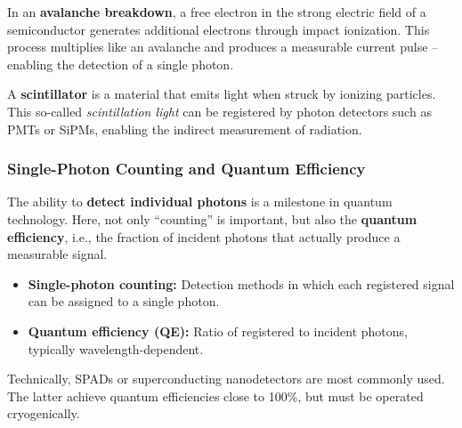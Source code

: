 \begin{tcolorbox}[didaktikbox, title=Concept: Avalanche Breakdown]
	\label{box:avalanche}
	\small
	In an \textbf{avalanche breakdown}, a free electron in the strong electric field of a semiconductor generates additional electrons through impact ionization. This process multiplies like an avalanche and produces a measurable current pulse – enabling the detection of a single photon.
\end{tcolorbox}
\vspace{1em}
\begin{tcolorbox}[didaktikbox, title=Concept: Scintillator]
	\label{box:szintillator}
	\small
	A \textbf{scintillator} is a material that emits light when struck by ionizing particles. This so-called \emph{scintillation light} can be registered by photon detectors such as PMTs or SiPMs, enabling the indirect measurement of radiation.
\end{tcolorbox}

\subsubsection{Single-Photon Counting and Quantum Efficiency}

The ability to \textbf{detect individual photons} is a milestone in quantum technology. Here, not only “counting” is important, but also the \textbf{quantum efficiency}, i.e., the fraction of incident photons that actually produce a measurable signal.
\vspace{1em}
\begin{tcolorbox}[physikbox, title=Physical Terms]
	\label{box:begriffe}
	\small
	\begin{itemize}
		\item \textbf{Single-photon counting:} Detection methods in which each registered signal can be assigned to a single photon.
		\item \textbf{Quantum efficiency (QE):} Ratio of registered to incident photons, typically wavelength-dependent.
	\end{itemize}
\end{tcolorbox}

Technically, SPADs or superconducting nanodetectors are most commonly used. The latter achieve quantum efficiencies close to 100\%, but must be operated cryogenically.
\newpage
\noindent

